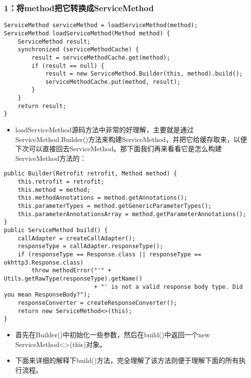 \documentclass[9pt, b5paper]{article}
\begin{document}
\subsubsection{1：将method把它转换成ServiceMethod}
\label{sec-1-3-1}
\begin{verbatim}
ServiceMethod serviceMethod = loadServiceMethod(method);
ServiceMethod loadServiceMethod(Method method) {
    ServiceMethod result;
    synchronized (serviceMethodCache) {
        result = serviceMethodCache.get(method);
        if (result == null) {
            result = new ServiceMethod.Builder(this, method).build();
            serviceMethodCache.put(method, result);
        }
    }
    return result;
}
\end{verbatim}
\begin{itemize}
\item loadServiceMethod源码方法中非常的好理解，主要就是通过ServiceMethod.Builder()方法来构建ServiceMethod，并把它给缓存取来，以便下次可以直接回去ServiceMethod。那下面我们再来看看它是怎么构建ServiceMethod方法的：
\end{itemize}
\begin{verbatim}
public Builder(Retrofit retrofit, Method method) {
    this.retrofit = retrofit;
    this.method = method;
    this.methodAnnotations = method.getAnnotations();
    this.parameterTypes = method.getGenericParameterTypes();
    this.parameterAnnotationsArray = method.getParameterAnnotations();
}
public ServiceMethod build() {
    callAdapter = createCallAdapter();
    responseType = callAdapter.responseType();
    if (responseType == Response.class || responseType == okhttp3.Response.class) 
        throw methodError("'" + Utils.getRawType(responseType).getName()
                          + "' is not a valid response body type. Did you mean ResponseBody?");
    responseConverter = createResponseConverter();
    return new ServiceMethod<>(this);
}
\end{verbatim}
\begin{itemize}
\item 首先在Builder()中初始化一些参数，然后在build()中返回一个new ServiceMethod<>(this)对象。
\item 下面来详细的解释下build()方法，完全理解了该方法则便于理解下面的所有执行流程。
\end{itemize}
\end{document}
